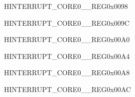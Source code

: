\begin{register}{H}{INTERRUPT\_CORE0\_\_REG}{0x0098}\label{regdesc:INTERRUPTCORE0SYSTIMERTARGET1INTMAPREG}






\end{register}\vspace{-3em}


\begin{register}{H}{INTERRUPT\_CORE0\_\_REG}{0x009C}\label{regdesc:INTERRUPTCORE0SYSTIMERTARGET2INTMAPREG}






\end{register}\vspace{-3em}


\begin{register}{H}{INTERRUPT\_CORE0\_\_REG}{0x00A0}\label{regdesc:INTERRUPTCORE0SPIMEMREJECTINTRMAPREG}






\end{register}\vspace{-3em}


\begin{register}{H}{INTERRUPT\_CORE0\_\_REG}{0x00A4}\label{regdesc:INTERRUPTCORE0ICACHEPRELOADINTMAPREG}






\end{register}\vspace{-3em}


\begin{register}{H}{INTERRUPT\_CORE0\_\_REG}{0x00A8}\label{regdesc:INTERRUPTCORE0ICACHESYNCINTMAPREG}






\end{register}\vspace{-3em}


\begin{register}{H}{INTERRUPT\_CORE0\_\_REG}{0x00AC}\label{regdesc:INTERRUPTCORE0APBADCINTMAPREG}






\end{register}\vspace{-3em}



